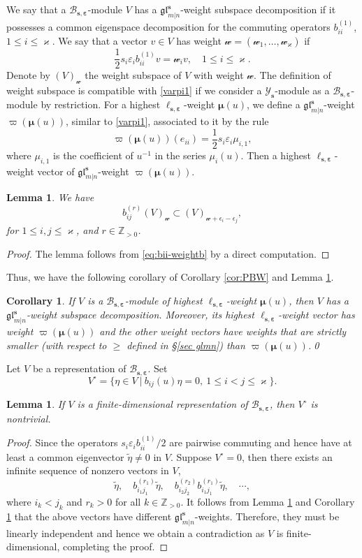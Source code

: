 \documentclass[11pt,reqno]{amsart}
\numberwithin{equation}{section}
\newtheorem{lem}[thm]{Lemma}
\newtheorem{cor}[thm]{Corollary}
\theoremstyle{definition}
\theoremstyle{remark}
\newcommand{\beq}{\begin{equation}}
\newcommand{\eeq}{\end{equation}}
\newcommand{\Z}{\mathbb{Z}}
\newcommand{\mc}{\mathcal}
\newcommand{\bZ}{\mathbb{Z}}
\newcommand{\tl}{\tilde}
\newcommand{\gge}{\geqslant}
\newcommand{\lle}{\leqslant}
\newcommand{\glMN}{\mathfrak{gl}_{m|n}^{\bm s}}
\newcommand{\YMN}{{\mathscr{Y}_{\bm s}}}
\newcommand{\BMN}{{\mathscr{B}_{\bm s,\bm \ve}}}
\newcommand{\ka}{\varkappa}
\newcommand{\ve}{\varepsilon}
\newcommand{\s}{{\bm s}}
\begin{document}
We say that a $\BMN$-module $V$ has a $\glMN$-weight subspace decomposition if it possesses a common eigenspace decomposition for the commuting operators $b_{ii}^{(1)}$, $1\lle i\lle \ka$. We say that a vector $v\in V$ has weight $\mc w=(\mc w_1,\dots,\mc w_\ka)$ if
\[
\frac{1}{2}s_i\ve_i b_{ii}^{(1)}v=\mc w_i v,\quad 1\lle i\lle \ka.
\]
Denote by $(V)_{\mc w}$ the weight subspace of $V$ with weight $\mc w$. The definition of weight subspace is compatible with \eqref{varpi1} if we consider a $\YMN$-module as a $\BMN$-module by restriction. For a highest $\ell_{\s,\bm \ve}$-weight $\bm\mu(u)$, we define a $\glMN$-weight $\varpi(\bm\mu(u))$, similar to \eqref{varpi1}, associated to  it by the rule
\beq\label{varpi2}
\varpi(\bm\mu(u))(e_{ii})=\frac{1}{2}s_i\ve_i\mu_{i,1},
\eeq
where $\mu_{i,1}$ is the coefficient of $u^{-1}$ in the series $\mu_i(u)$. Then a highest $\ell_{\s,\bm\ve}$-weight vector of $\glMN$-weight $\varpi(\bm\mu(u))$.

\begin{lem}\label{lem:wt-changeb}
We have
\[
b_{ij}^{(r)}(V)_{\mc w}\subset (V)_{\mc w+\epsilon_i-\epsilon_j},
\]
for $1\lle i, j\lle \ka$, and $r\in\bZ_{>0}$.
\end{lem}
\begin{proof}
The lemma follows from \eqref{eq:bii-weightb} by a direct computation.
\end{proof}

Thus, we have the following corollary of Corollary \ref{cor:PBW} and Lemma \ref{lem:wt-changeb}.
\begin{cor}\label{cor:wt-changeb}
If $V$ is a $\BMN$-module of highest $\ell_{\s,\bm\ve}$-weight $\bm\mu(u)$, then $V$ has a $\glMN$-weight subspace decomposition. Moreover, its highest $\ell_{\s,\bm\ve}$-weight vector has weight $\varpi(\bm\mu(u))$ and the other weight vectors have weights that are strictly smaller (with respect to $\gge$ defined in \S \ref{sec glmn}) than $\varpi(\bm\mu(u))$.\qed
\end{cor}


Let $V$ be a representation of $\BMN$. Set
$$
V^\circ=\{\eta\in V~|~b_{ij}(u)\eta=0,\ 1\lle i<j\lle \ka\}.
$$
\begin{lem}\label{lem:nontrivial}
If $V$ is a finite-dimensional representation of $\BMN$, then $V^\circ$ is nontrivial.
\end{lem}
\begin{proof}
Since the operators $s_i\ve_ib_{ii}^{(1)}/2$ are pairwise commuting and hence have at least a common eigenvector $\tl\eta\ne 0$ in $V$. Suppose $V^\circ=0$, then there exists an infinite sequence of nonzero vectors in $V$,
\[
\tl\eta,\quad b_{i_1j_1}^{(r_1)}\tl\eta,\quad b_{i_2j_2}^{(r_2)}b_{i_1j_1}^{(r_1)}\tl\eta,\quad \cdots,
\]
where $i_k<j_k$ and $r_k>0$ for all $k\in \Z_{>0}$. It follows from Lemma \ref{lem:wt-changeb} and Corollary \ref{cor:wt-changeb} that the above vectors have different $\glMN$-weights. Therefore, they must be linearly independent and hence we obtain a contradiction as $V$ is finite-dimensional, completing the proof.
\end{proof}
\end{document}
